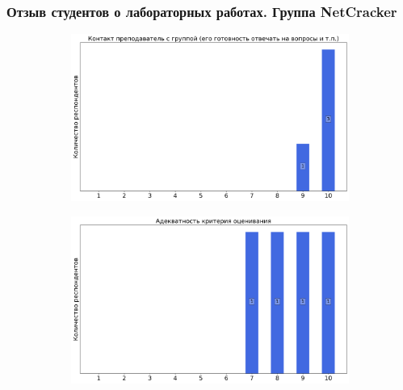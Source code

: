     \subsubsection{Отзыв студентов о лабораторных работах. Группа NetCracker}
        \begin{figure}[H]
            \centering
            \begin{subfigure}[b]{0.45\textwidth}
                \centering
                \includegraphics[width=\textwidth]{images/3 course/Лаборатория инфокоммуникационных технологий/labniks-marks-NetCracker-0.png}
            \end{subfigure}
            \begin{subfigure}[b]{0.45\textwidth}
                \centering
                \includegraphics[width=\textwidth]{images/3 course/Лаборатория инфокоммуникационных технологий/labniks-marks-NetCracker-1.png}
            \end{subfigure}
            \begin{subfigure}[b]{0.45\textwidth}
                \centering

\end{subfigure}
\end{figure}

